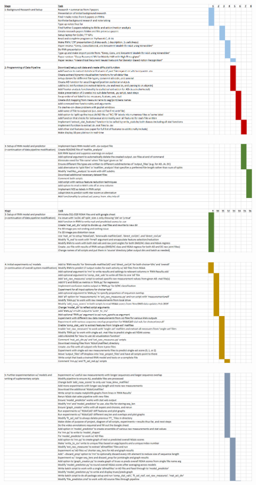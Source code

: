 \documentclass[12pt,twoside]{report}
\begin{document}
\begin{center}
\includegraphics[scale=0.4]{project_figures/fig12_1}
\end{center}

\begin{center}
\includegraphics[scale=0.4]{project_figures/fig12_2}
\end{center}

\begin{center}
\includegraphics[scale=0.4]{project_figures/fig12_3}
\end{center}

\begin{center}
\includegraphics[scale=0.4]{project_figures/fig12_4}
\end{center}
\end{document}
